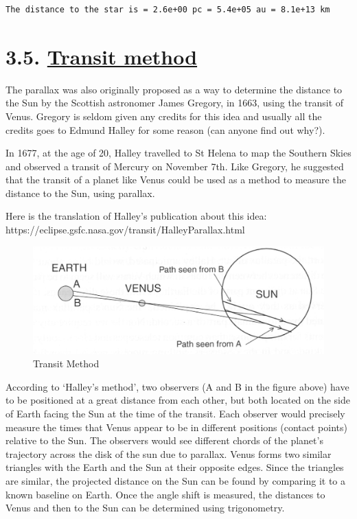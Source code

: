 \documentclass[
  letterpaper,
  DIV=11,
  numbers=noendperiod]{scrreprt}
\begin{document}
\begin{verbatim}
The distance to the star is = 2.6e+00 pc = 5.4e+05 au = 8.1e+13 km
\end{verbatim}

\hypertarget{transit-method}{%
\section{\texorpdfstring{3.5. \protect\hyperlink{toc0_}{Transit
method}}{3.5. Transit method}}\label{transit-method}}

The parallax was also originally proposed as a way to determine the
distance to the Sun by the Scottish astronomer James Gregory, in 1663,
using the transit of Venus. Gregory is seldom given any credits for this
idea and usually all the credits goes to Edmund Halley for some reason
(can anyone find out why?).

In 1677, at the age of 20, Halley travelled to St Helena to map the
Southern Skies and observed a transit of Mercury on November 7th. Like
Gregory, he suggested that the transit of a planet like Venus could be
used as a method to measure the distance to the Sun, using parallax.

Here is the translation of Halley's publication about this idea:
https://eclipse.gsfc.nasa.gov/transit/HalleyParallax.html

\begin{figure}

{\centering \includegraphics{img/TransitMethod.png}

}

\caption{Transit Method}

\end{figure}

According to `Halley's method', two observers (A and B in the figure
above) have to be positioned at a great distance from each other, but
both located on the side of Earth facing the Sun at the time of the
transit. Each observer would precisely measure the times that Venus
appear to be in different positions (contact points) relative to the
Sun. The observers would see different chords of the planet's trajectory
across the disk of the sun due to parallax. Venus forms two similar
triangles with the Earth and the Sun at their opposite edges. Since the
triangles are similar, the projected distance on the Sun can be found by
comparing it to a known baseline on Earth. Once the angle shift is
measured, the distances to Venus and then to the Sun can be determined
using trigonometry.
\end{document}
